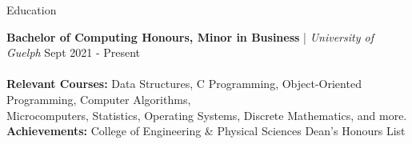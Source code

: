 \begin{rSection}{Education}

\textbf{Bachelor of Computing Honours, Minor in Business} | \textit{University of Guelph} \hfill {Sept 2021 - Present}\\
\vspace{-0.9em}\\
\hspace*{1em} \small \textbf{Relevant Courses:} \footnotesize \hspace*{0.6em} Data Structures, C Programming, Object-Oriented Programming, Computer Algorithms, \\ \hspace*{12.51em} Microcomputers, Statistics, Operating Systems, Discrete Mathematics, and more. \normalsize \vspace{0.2em} \\ 
\hspace*{1em} \small \textbf{Achievements:} \hspace*{2.4em}  \footnotesize College of Engineering \& Physical Sciences Dean’s Honours List
\end{rSection}

